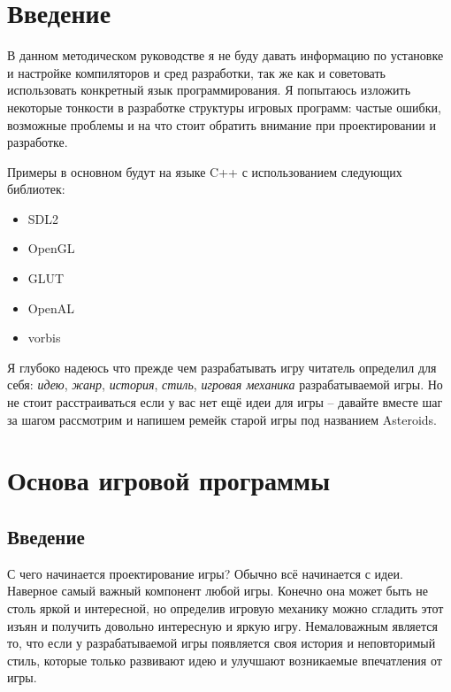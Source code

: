 \chapter{Введение} %


В данном методическом руководстве я не буду давать информацию по установке и настройке компиляторов и 
сред разработки, так же как и советовать использовать конкретный язык программирования. Я попытаюсь 
изложить некоторые тонкости в разработке структуры игровых программ: частые ошибки, возможные проблемы и 
на что стоит обратить внимание при проектировании и разработке.

Примеры в основном будут на языке C++ с использованием следующих библиотек:
\begin{itemize}
    \item SDL2
    \item OpenGL
    \item GLUT
    \item OpenAL
    \item vorbis
\end{itemize}

Я глубоко надеюсь что прежде чем разрабатывать игру читатель определил для себя: \emph{идею}, \emph{жанр}, 
\emph{история}, \emph{стиль}, \emph{игровая механика} разрабатываемой игры. Но не стоит расстраиваться если 
у вас нет ещё идеи для игры -- давайте вместе шаг за шагом рассмотрим и напишем ремейк старой игры под 
названием Asteroids.

\chapter{Основа игровой программы}
\section{Введение}
С чего начинается проектирование игры? Обычно всё начинается с идеи. Наверное самый важный компонент 
любой игры. Конечно она может быть не столь яркой и интересной, но определив игровую механику можно 
сгладить этот изъян и получить довольно интересную и яркую игру. Немаловажным является то, что если у 
разрабатываемой игры появляется своя история и неповторимый стиль, которые только развивают идею и 
улучшают возникаемые впечатления от игры.

